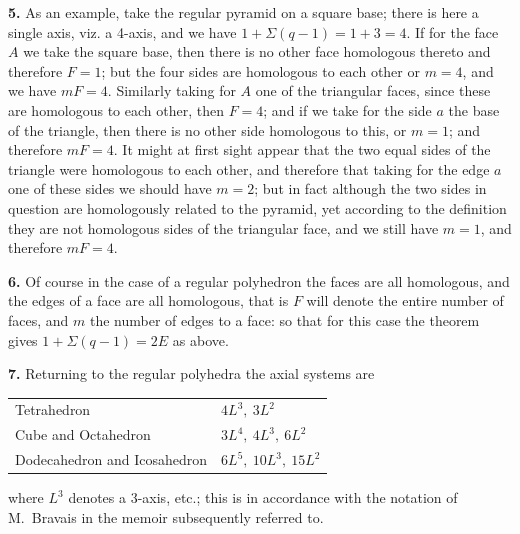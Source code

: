 \documentclass[11pt]{article}
\begin{document}
\textbf{5.} As an example, take the regular pyramid on a square base; there is here a single axis, viz. a 4-axis, and we have $1 + \Sigma(q - 1) = 1 + 3 = 4$. If for the face $A$ we take the square base, then there is no other face homologous thereto and therefore $F = 1$; but the four sides are homologous to each other or $m = 4$, and we have $mF = 4$. Similarly taking for $A$ one of the triangular faces, since these are homologous to each other, then $F = 4$; and if we take for the side $a$ the base of the triangle, then there is no other side homologous to this, or $m = 1$; and therefore $mF = 4$. It might at first sight appear that the two equal sides of the triangle were homologous to each other, and therefore that taking for the edge $a$ one of these sides we should have $m = 2$; but in fact although the two sides in question are homologously related to the pyramid, yet according to the definition they are not homologous sides of the triangular face, and we still have $m = 1$, and therefore $mF = 4$.

\textbf{6.} Of course in the case of a regular polyhedron the faces are all homologous, and the edges of a face are all homologous, that is $F$ will denote the entire number of faces, and $m$ the number of edges to a face: so that for this case the theorem gives $1 + \Sigma(q - 1) = 2E$ as above.

\textbf{7.} Returning to the regular polyhedra the axial systems are
\begin{center}
\begin{tabular}{ll}
Tetrahedron & $4L^3,\ 3L^2$\\
Cube and Octahedron & $3L^4,\ 4L^3,\ 6L^2$\\
Dodecahedron and Icosahedron & $6L^5,\ 10L^3,\ 15L^2$
\end{tabular}
\end{center}
where $L^3$ denotes a 3-axis, etc.; this is in accordance with the notation of M.~Bravais in the memoir subsequently referred to.
\end{document}
